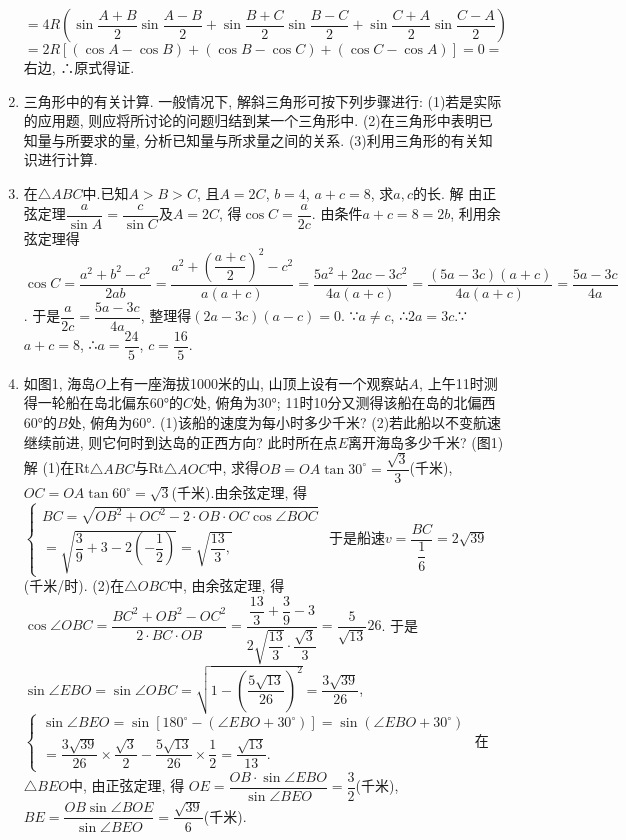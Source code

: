 \documentclass[10pt,a4paper]{article}
\begin{document}
\begin{enumerate}[1.]
$=4R(\sin \dfrac{A+B}2\sin \dfrac{A-B}2+\sin \dfrac{B+C}2\sin \dfrac{B-C}2+\sin \dfrac{C+A}2\sin \dfrac{C-A}2)$
$=2R[(\cos A-\cos B)+(\cos B-\cos C)+(\cos C-\cos A)]=0=$右边,
∴原式得证.
\item 三角形中的有关计算.
一般情况下, 解斜三角形可按下列步骤进行:
(1)若是实际的应用题, 则应将所讨论的问题归结到某一个三角形中.
(2)在三角形中表明已知量与所要求的量, 分析已知量与所求量之间的关系.
(3)利用三角形的有关知识进行计算.
\item 在$\triangle ABC$中.已知$A>B>C$, 且$A=2C$, $b=4$, $a+c=8$, 求$a,c$的长.
解  由正弦定理$\dfrac a{\sin A}=\dfrac c{\sin C}$及$A=2C$, 得$\cos C=\dfrac a{2c}$.
由条件$a+c=8=2b$, 利用余弦定理得
$\cos C=\dfrac{a^2+b^2-c^2}{2ab}=\dfrac{a^2+(\dfrac{a+c}2)^2-c^2}{a(a+c)}=\dfrac{5a^2+2ac-3c^2}{4a(a+c)}=\dfrac {(5a-3c)(a+c)}{4a(a+c)}=\dfrac{5a-3c}{4a}$.
于是$\dfrac a{2c}=\dfrac{5a-3c}{4a}$, 整理得$(2a-3c)(a-c)=0$.
∵$a\ne c$, ∴$2a=3c$.∵$a+c=8$, ∴$a=\dfrac{24}5$, $c=\dfrac{16}5$.
\item 如图1, 海岛$O$上有一座海拔1000米的山, 山顶上设有一个观察站$A$, 上午11时测得一轮船在岛北偏东60°的$C$处, 俯角为30°; 11时10分又测得该船在岛的北偏西60°的$B$处, 俯角为60°.
(1)该船的速度为每小时多少千米?
(2)若此船以不变航速继续前进, 则它何时到达岛的正西方向? 此时所在点$E$离开海岛多少千米?
(图1)
解  (1)在Rt$\triangle ABC$与Rt$\triangle AOC$中, 求得$OB=OA\tan 30^\circ =\dfrac{\sqrt 3}3$(千米),
$OC=OA\tan 60^{\circ }=\sqrt 3$(千米).由余弦定理, 得
$\begin{cases} BC=\sqrt {OB^2+OC^2-2\cdot OB\cdot OC\cos \angle BOC} \\ =\sqrt {\dfrac 39+3-2(-\dfrac 12)}=\sqrt {\dfrac{13}3,}
\end{cases}$
于是船速$v=\dfrac{BC}{\dfrac 16}=2\sqrt {39}$(千米/时).
(2)在$\triangle OBC$中, 由余弦定理, 得$\cos \angle OBC=\dfrac{BC^2+OB^2-OC^2}{2\cdot BC\cdot OB}=\dfrac{\dfrac{13}3+\dfrac 39-3}{2\sqrt {\dfrac{13}3}\cdot \dfrac{\sqrt 3}3}=\dfrac 5{\sqrt {13}}{26}$.
于是$\sin \angle EBO=\sin \angle OBC=\sqrt {1-(\dfrac{5\sqrt {13}}{26})^2}=\dfrac{3\sqrt {39}}{26}$,
$\begin{cases} \sin \angle BEO=\sin [180^\circ -(\angle EBO+30^\circ)]=\sin (\angle EBO+30^\circ) \\ =\dfrac{3\sqrt {39}}{26}\times \dfrac{\sqrt 3}2-\dfrac{5\sqrt {13}}{26}\times \dfrac 12=\dfrac{\sqrt {13}}{13}.
\end{cases}$
在$\triangle BEO$中, 由正弦定理, 得
$OE=\dfrac{OB\cdot \sin \angle EBO}{\sin \angle BEO}=\dfrac 32$(千米), $BE=\dfrac{OB\sin \angle BOE}{\sin \angle BEO}=\dfrac{\sqrt {39}}6$(千米).

\end{enumerate}
\end{document}
